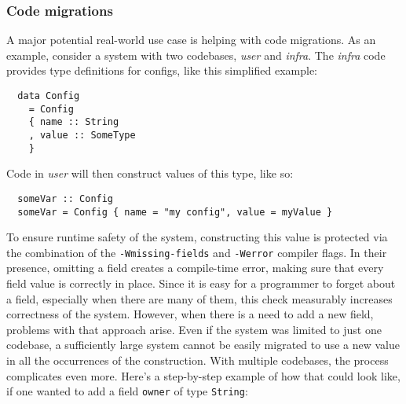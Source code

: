 \documentclass[en]{pracamgr}
\newcommand{\code}[1]{\lstinline[breaklines=true]{#1}}
\begin{document}
\subsubsection{Code migrations}
\newcommand{\user}{\textit{user}}
\newcommand{\infra}{\textit{infra}}
A major potential real-world use case is helping with code migrations.
As an example, consider a system with two codebases, \user{} and \infra{}.
The \infra{} code provides type definitions for configs, like this simplified example:\\
\begin{minipage}{\linewidth}
\begin{lstlisting}
  data Config 
    = Config
    { name :: String
    , value :: SomeType
    }
\end{lstlisting}
\end{minipage}
Code in \user{} will then construct values of this type, like so:\\
\begin{minipage}{\linewidth}
\begin{lstlisting}
  someVar :: Config
  someVar = Config { name = "my config", value = myValue }
\end{lstlisting}
\end{minipage}
To ensure runtime safety of the system, constructing this value is protected via the combination of the 
\code{-Wmissing-fields} and \code{-Werror} compiler flags. 
In their presence, omitting a field creates a compile-time error, making sure that every field value is correctly in place.
Since it is easy for a programmer to forget about a field, especially when there are many of them, this check
measurably increases correctness of the system. 
However, when there is a need to add a new field, problems with that approach arise. 
Even if the system was limited to just one codebase, a sufficiently large system cannot be easily migrated to use a new value
in all the occurrences of the construction. With multiple codebases, the process complicates even more. Here's a step-by-step
example of how that could look like, if one wanted to add a field \code{owner} of type \code{String}:
\newcommand{\defaultconf}{\code{defaultConfig}}
\newcommand{\conf}{\code{Config}}
\end{document}
